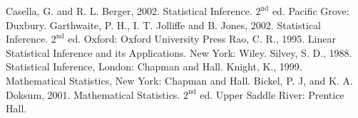 \documentclass[12pt,a4paper]{report}
\theoremstyle{definition}
\begin{document}
\begin{thebibliography}{}
\bibitem{}{}
Casella, G. and R. L. Berger, 2002. Statistical Inference. $2^{\text{nd}}$ ed. Pacific Grove: Duxbury.
\bibitem{}{}
Garthwaite, P. H., I. T. Jolliffe and B. Jones, 2002. Statistical Inference. $2^{\text{nd}}$ ed. Oxford: Oxford University Press
\bibitem{}{}
Rao, C. R., 1995. Linear Statistical Inference and its Applications. New York: Wiley.
\bibitem{}{}
Silvey, S. D., 1988. Statistical Inference, London: Chapman and Hall.
\bibitem{}{}
Knight, K., 1999. Mathematical Statistics, New York: Chapman and Hall.
\bibitem{}{}
Bickel, P. J, and K. A. Doksum, 2001. Mathematical Statistics. $2^{\text{nd}}$ ed. Upper Saddle River: Prentice Hall.
\end{thebibliography}
\end{document}
